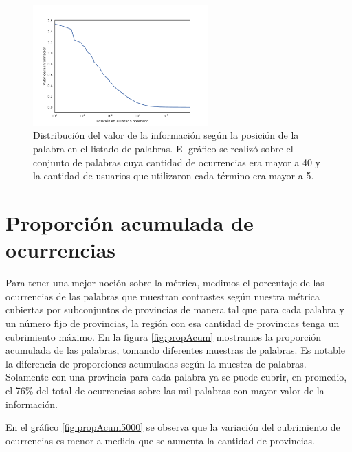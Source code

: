 \begin{figure}[ht]
\centering
\includegraphics[width=0.6\textwidth]{./images/train/conFiltro/valorInformacionCorte.pdf}
\caption{Distribución del valor de la información según la posición de la palabra en el listado de palabras. El gráfico se realizó sobre el conjunto de palabras cuya cantidad de ocurrencias era mayor a 40 y la cantidad de usuarios que utilizaron cada término era mayor a 5. } 
\label{fig:ivalue}
\end{figure}


\section{Proporción acumulada de ocurrencias} %
\label{proporcionDeOcurrencias}

Para tener una mejor noción sobre la métrica, medimos el porcentaje de las ocurrencias de las palabras que muestran contrastes según nuestra métrica cubiertas por subconjuntos de provincias de manera tal que para cada palabra y un número fijo de provincias, la región con esa cantidad de provincias tenga un cubrimiento máximo. 
En la figura \ref{fig:propAcum} mostramos la proporción acumulada de las palabras, tomando diferentes muestras de palabras. Es notable la diferencia de proporciones acumuladas según la muestra de palabras. Solamente con una provincia para cada palabra ya se puede cubrir, en promedio, el 76\% del total de ocurrencias sobre las mil palabras con mayor valor de la información.

En el gráfico \ref{fig:propAcum5000} se observa que la variación del cubrimiento de ocurrencias es menor a medida que se aumenta la cantidad de provincias. 



